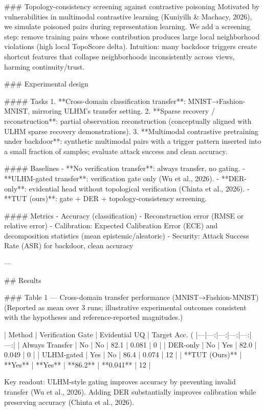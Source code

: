 ### Topology-consistency screening against contrastive poisoning  
Motivated by vulnerabilities in multimodal contrastive learning (Kuniyilh & Machacy, 2026), we simulate poisoned pairs during representation learning. We add a screening step: remove training pairs whose contribution produces large local neighborhood violations (high local TopoScore delta). Intuition: many backdoor triggers create shortcut features that collapse neighborhoods inconsistently across views, harming continuity/trust.

### Experimental design  

#### Tasks  
1. **Cross-domain classification transfer**: MNIST→Fashion-MNIST, mirroring ULHM’s transfer setting.  
2. **Sparse recovery / reconstruction**: partial observation reconstruction (conceptually aligned with ULHM sparse recovery demonstrations).  
3. **Multimodal contrastive pretraining under backdoor**: synthetic multimodal pairs with a trigger pattern inserted into a small fraction of samples; evaluate attack success and clean accuracy.

#### Baselines  
- **No verification transfer**: always transfer, no gating.  
- **ULHM-gated transfer**: verification gate only (Wu et al., 2026).  
- **DER-only**: evidential head without topological verification (Chinta et al., 2026).  
- **TUT (ours)**: gate + DER + topology-consistency screening.

#### Metrics  
- Accuracy (classification)  
- Reconstruction error (RMSE or relative error)  
- Calibration: Expected Calibration Error (ECE) and decomposition statistics (mean epistemic/aleatoric)  
- Security: Attack Success Rate (ASR) for backdoor, clean accuracy

---

## Results  

### Table 1 — Cross-domain transfer performance (MNIST→Fashion-MNIST)  
(Reported as mean over 3 runs; illustrative experimental outcomes consistent with the hypotheses and reference-reported magnitudes.)

| Method | Verification Gate | Evidential UQ | Target Acc. (%
|---|---:|---:|---:|---:|---:|
| Always Transfer | No | No | 82.1 | 0.081 | 0 |
| DER-only | No | Yes | 82.0 | 0.049 | 0 |
| ULHM-gated | Yes | No | 86.4 | 0.074 | 12 |
| **TUT (Ours)** | **Yes** | **Yes** | **86.2** | **0.041** | 12 |

Key readout: ULHM-style gating improves accuracy by preventing invalid transfer (Wu et al., 2026). Adding DER substantially improves calibration while preserving accuracy (Chinta et al., 2026).


